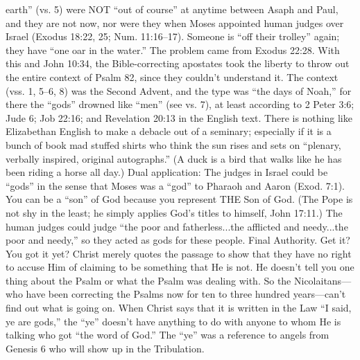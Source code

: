 {earth” (vs. 5) were NOT “out of course” at
anytime between Asaph and Paul, and they
are not now, nor were they when Moses
appointed human judges over Israel (Exodus 18:22, 25; Num. 11:16--17). Someone is “off their trolley” again; they have “one oar in the water.” The problem came from Exodus 22:28. With this and John 10:34, the Bible-correcting apostates took the liberty to throw out the entire context of Psalm 82, since they couldn’t understand it. The context (vss. 1, 5–6, 8) was the Second Advent, and the type was “the days of Noah,” for there the “gods” drowned like “men” (see vs. 7), at least according to 2 Peter 3:6; Jude 6; Job 22:16;  and Revelation 20:13 in the English text. There is nothing like Elizabethan English to make a debacle out of a seminary; especially if it is a bunch of book mad stuffed shirts who think the sun rises and sets on “plenary, verbally inspired, original autographs.” (A duck is a bird that walks like he has been riding a horse all day.) Dual application: The judges in Israel could be “gods” in the sense that Moses was a “god” to Pharaoh and Aaron (Exod. 7:1). You can be a “son” of God because you represent THE Son of God. (The Pope is not shy in the least; he simply applies God’s titles to himself, John 17:11.) The human judges could judge “the poor and fatherless...the afflicted and needy...the poor and needy,” so they acted as gods for these people. Final Authority. Get it? You got it yet? Christ merely quotes the passage to show that they have no right to accuse Him of claiming to be something that He is not. He doesn’t tell you one thing about the Psalm or what the Psalm was dealing with. So the Nicolaitans—who have been correcting the Psalms now for ten to three hundred years—can’t find out what is going on. When Christ says that it is written in the Law “I said, ye are gods,” the “ye” doesn’t have anything to do with anyone to whom He is talking who got “the word of God.” The “ye” was a reference to angels from Genesis 6 who will show up in the
Tribulation. \cite{Ruckman1992Psalms}}

